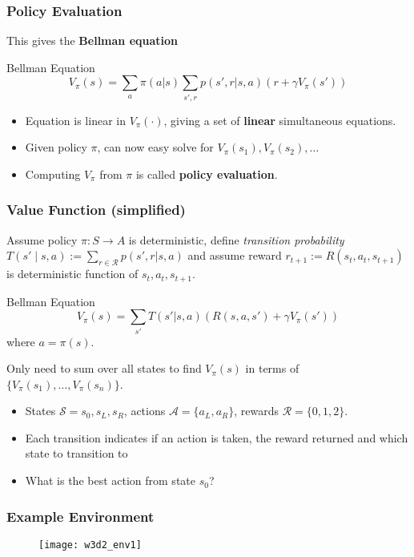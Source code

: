 \documentclass[10pt,a4paper, handout]{beamer}
\renewcommand{\S}{\mathcal{S}}
\newcommand{\A}{\mathcal{A}}
\newcommand{\R}{\mathcal{R}}
\begin{document}
\begin{frame}
	\frametitle{Policy Evaluation}
	This gives the \textbf{Bellman equation}
	\begin{block}{Bellman Equation}
		$$
		V_\pi(s) = \sum_{a} \pi(a | s) \sum_{s', r} p(s', r | s, a) \left( r + \gamma V_\pi(s') \right) 
		$$
	\end{block}

\begin{itemize}
	\pause
\item Equation is linear in $V_{\pi}(\cdot)$, 
giving a set of \textbf{linear} simultaneous equations.
\pause
\item Given policy $\pi$, can now easy solve for $V_{\pi}(s_1), V_{\pi}(s_2), \ldots$
\pause
\item Computing $V_\pi$ from $\pi$ is called \textbf{policy evaluation}.
\end{itemize}
\end{frame}

\begin{frame}
\frametitle{Value Function (simplified)}
Assume policy $\pi : S \to A$ is deterministic, define
\textit{transition probability} $T(s' \mid s, a) := \sum_{r \in \R} p(s',r | s, a)$
and assume reward $r_{t+1} := R(s_t, a_t, s_{t+1})$ 
is deterministic function of $s_t, a_t, s_{t+1}$.
\begin{block}{Bellman Equation}
	$$
	V_\pi(s) = \sum_{s'} T(s' | s, a) \left( R(s,a,s') + \gamma V_\pi(s') \right) 
	$$
	where $a = \pi(s)$.
\end{block}
\pause
Only need to sum over all states to find $V_\pi(s)$ in terms of
$\{V_\pi(s_1), \ldots, V_\pi(s_n)\}$. 
\end{frame}



\begin{frame}
	\begin{itemize}
		\item States $\S = {s_0, s_L,s_R}$, actions $\A = \{a_L, a_R\}$,
		rewards $\R= \{0,1,2\}$.
		\item Each transition indicates if an action is taken, the reward returned
		and which state to transition to
		\item What is the best action from state $s_0$?
	\end{itemize}
	\frametitle{Example Environment}
	\begin{figure}
		\centering
		\texttt{[image: w3d2\_env1]}
		\label{fig:w3d2env1}
	\end{figure}
\end{frame}
\end{document}

